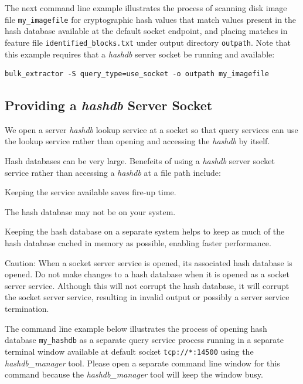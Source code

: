 \documentclass[11pt,twoside]{article}
\newcommand \hdb {\textit{hashdb}\xspace}
\newcommand \hdbm {\textit{hashdb\_manager}\xspace}
\begin{document}
The next command line example illustrates the process of scanning
disk image file \texttt{my\_imagefile}
for cryptographic hash values that match values present
in the hash database available at the default socket endpoint,
and placing
matches in feature file \texttt{identified\_blocks.txt}
under output directory \texttt{outpath}.
Note that this example requires that a \hdb server socket be running
and available:

\begin{small}
\begin{verbatim}
bulk_extractor -S query_type=use_socket -o outpath my_imagefile
\end{verbatim}
\end{small}

\subsection{Providing a \hdb Server Socket}
We open a server \hdb lookup service at a socket
so that query services can use the lookup service rather than
opening and accessing the \hdb by itself.

Hash databases can be very large.
Benefeits of using a \hdb server socket service
rather than accessing a \hdb at a file path include:
\begin{compactitem}	
\item Keeping the service available saves fire-up time.
\item The hash database may not be on your system.
\item Keeping the hash database on a separate system helps to
keep as much of the hash database cached in memory as possible,
enabling faster performance.
\end{compactitem}	

Caution: When a socket server service is opened,
its associated hash database is opened.
Do not make changes to a hash database
when it is opened as a socket server service.
Although this will not corrupt the hash database,
it will corrupt the socket server service,
resulting in invalid output or possibly a server service termination.

The command line example below illustrates the process of opening
hash database \texttt{my\_hashdb} as a separate
query service process running in a separate terminal window
available at default socket \texttt{tcp://*:14500}
using the \hdbm tool.
Please open a separate command line window for this command
because the \hdbm tool will keep the window busy.
\end{document}
